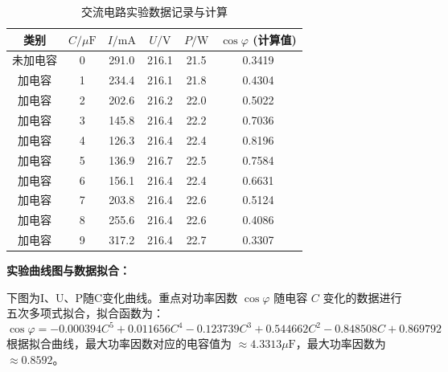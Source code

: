 \documentclass[]{../../templates/Report}%
\begin{document}
\begin{fullreportonly}
    \begin{table}[H]
        \centering
        \caption{交流电路实验数据记录与计算}
        \label{tab:ac_data}
        \begin{tabular}{cccccc}
            \toprule
            \textbf{类别} & $C / \mu \text{F}$ & $I / \text{mA}$ & $U / \text{V}$ & $P / \text{W}$ & $\cos\varphi$ (计算值) \\
            \midrule
            未加电容        & 0                  & 291.0           & 216.1          & 21.5           & 0.3419              \\
            加电容         & 1                  & 234.4           & 216.1          & 21.8           & 0.4304              \\
            加电容         & 2                  & 202.6           & 216.2          & 22.0           & 0.5022              \\
            加电容         & 3                  & 145.8           & 216.4          & 22.2           & 0.7036              \\
            加电容         & 4                  & 126.3           & 216.4          & 22.4           & 0.8196              \\
            加电容         & 5                  & 136.9           & 216.7          & 22.5           & 0.7584              \\
            加电容         & 6                  & 156.1           & 216.4          & 22.4           & 0.6631              \\
            加电容         & 7                  & 203.8           & 216.4          & 22.6           & 0.5124              \\
            加电容         & 8                  & 255.6           & 216.4          & 22.6           & 0.4086              \\
            加电容         & 9                  & 317.2           & 216.4          & 22.7           & 0.3307              \\
            \bottomrule
        \end{tabular}
    \end{table}

    \def\Cmax{4.3313}
    \def\cosphimax{0.8592}
    \def\fitfunc{-0.000394*x^5 + 0.011656*x^4 - 0.123739*x^3 + 0.544662*x^2 - 0.848508*x + 0.869792}

    \textbf{实验曲线图与数据拟合：}

    下图为I、U、P随C变化曲线。重点对功率因数 $\cos\varphi$ 随电容 $C$ 变化的数据进行五次多项式拟合，拟合函数为：
    $$ \cos\varphi = -0.000394C^5 + 0.011656C^4 - 0.123739C^3 + 0.544662C^2 - 0.848508C + 0.869792 $$
    根据拟合曲线，最大功率因数对应的电容值为 $\approx \Cmax \mu\text{F}$，最大功率因数为 $\approx \cosphimax$。


\end{fullreportonly}
\end{document}
